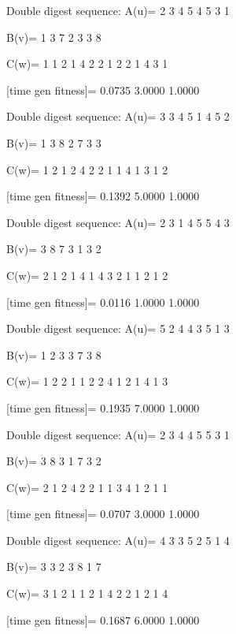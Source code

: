 Double digest sequence:
A(u)=
     2     3     4     5     4     5     3     1

B(v)=
     1     3     7     2     3     3     8

C(w)=
     1     1     2     1     4     2     2     1     2     2     1     4     3     1

[time gen fitness]=
    0.0735    3.0000    1.0000

Double digest sequence:
A(u)=
     3     3     4     5     1     4     5     2

B(v)=
     1     3     8     2     7     3     3

C(w)=
     1     2     1     2     4     2     2     1     1     4     1     3     1     2

[time gen fitness]=
    0.1392    5.0000    1.0000

Double digest sequence:
A(u)=
     2     3     1     4     5     5     4     3

B(v)=
     3     8     7     3     1     3     2

C(w)=
     2     1     2     1     4     1     4     3     2     1     1     2     1     2

[time gen fitness]=
    0.0116    1.0000    1.0000

Double digest sequence:
A(u)=
     5     2     4     4     3     5     1     3

B(v)=
     1     2     3     3     7     3     8

C(w)=
     1     2     2     1     1     2     2     4     1     2     1     4     1     3

[time gen fitness]=
    0.1935    7.0000    1.0000

Double digest sequence:
A(u)=
     2     3     4     4     5     5     3     1

B(v)=
     3     8     3     1     7     3     2

C(w)=
     2     1     2     4     2     2     1     1     3     4     1     2     1     1

[time gen fitness]=
    0.0707    3.0000    1.0000

Double digest sequence:
A(u)=
     4     3     3     5     2     5     1     4

B(v)=
     3     3     2     3     8     1     7

C(w)=
     3     1     2     1     1     2     1     4     2     2     1     2     1     4

[time gen fitness]=
    0.1687    6.0000    1.0000

